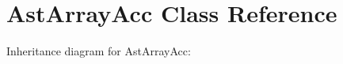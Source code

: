 \hypertarget{classAstArrayAcc}{}\section{Ast\+Array\+Acc Class Reference}
\label{classAstArrayAcc}


Inheritance diagram for Ast\+Array\+Acc\+:
